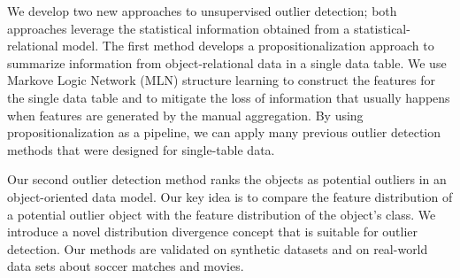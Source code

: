 We develop two new approaches to unsupervised outlier detection; both approaches leverage the statistical information obtained from a statistical-relational model. The first method develops a propositionalization approach to summarize information from object-relational data in a single data table.
We use Markove Logic Network (MLN) structure learning to construct the features for the single data table and to mitigate the loss of information that usually happens when features are generated by the manual aggregation.  By using propositionalization as a pipeline, we can apply many previous outlier detection methods that were designed for single-table data.
 
Our second outlier detection method ranks the objects as potential
outliers in an object-oriented data model. Our key idea is to compare the feature distribution of a potential outlier object with the feature distribution of the
object’s class. We introduce a novel distribution divergence
concept that is suitable for outlier detection. Our methods are validated on synthetic datasets and on real-world data
sets about soccer matches and movies.
%
%



















